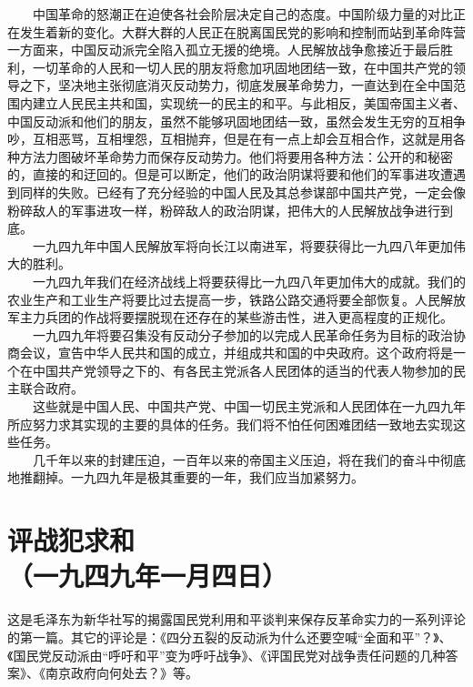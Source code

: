 \documentclass[cn,11pt,chinese]{elegantbook}
\def\myformat#1{\hfil\hfil #1}
\begin{document}
　　中国革命的怒潮正在迫使各社会阶层决定自己的态度。中国阶级力量的对比正在发生着新的变化。大群大群的人民正在脱离国民党的影响和控制而站到革命阵营一方面来，中国反动派完全陷入孤立无援的绝境。人民解放战争愈接近于最后胜利，一切革命的人民和一切人民的朋友将愈加巩固地团结一致，在中国共产党的领导之下，坚决地主张彻底消灭反动势力，彻底发展革命势力，一直达到在全中国范围内建立人民民主共和国，实现统一的民主的和平。与此相反，美国帝国主义者、中国反动派和他们的朋友，虽然不能够巩固地团结一致，虽然会发生无穷的互相争吵，互相恶骂，互相埋怨，互相抛弃，但是在有一点上却会互相合作，这就是用各种方法力图破坏革命势力而保存反动势力。他们将要用各种方法：公开的和秘密的，直接的和迂回的。但是可以断定，他们的政治阴谋将要和他们的军事进攻遭遇到同样的失败。已经有了充分经验的中国人民及其总参谋部中国共产党，一定会像粉碎敌人的军事进攻一样，粉碎敌人的政治阴谋，把伟大的人民解放战争进行到底。\\
　　一九四九年中国人民解放军将向长江以南进军，将要获得比一九四八年更加伟大的胜利。\\
　　一九四九年我们在经济战线上将要获得比一九四八年更加伟大的成就。我们的农业生产和工业生产将要比过去提高一步，铁路公路交通将要全部恢复。人民解放军主力兵团的作战将要摆脱现在还存在的某些游击性，进入更高程度的正规化。\\
　　一九四九年将要召集没有反动分子参加的以完成人民革命任务为目标的政治协商会议，宣告中华人民共和国的成立，并组成共和国的中央政府。这个政府将是一个在中国共产党领导之下的、有各民主党派各人民团体的适当的代表人物参加的民主联合政府。\\
　　这些就是中国人民、中国共产党、中国一切民主党派和人民团体在一九四九年所应努力求其实现的主要的具体的任务。我们将不怕任何困难团结一致地去实现这些任务。\\
　　几千年以来的封建压迫，一百年以来的帝国主义压迫，将在我们的奋斗中彻底地推翻掉。一九四九年是极其重要的一年，我们应当加紧努力。\\
\newpage\section*{\myformat{评战犯求和}\\\myformat{（一九四九年一月四日）}}
\begin{introduction}\item  这是毛泽东为新华社写的揭露国民党利用和平谈判来保存反革命实力的一系列评论的第一篇。其它的评论是：《四分五裂的反动派为什么还要空喊“全面和平”？》、《国民党反动派由“呼吁和平”变为呼吁战争》、《评国民党对战争责任问题的几种答案》、《南京政府向何处去？》等。\end{introduction}
\end{document}
